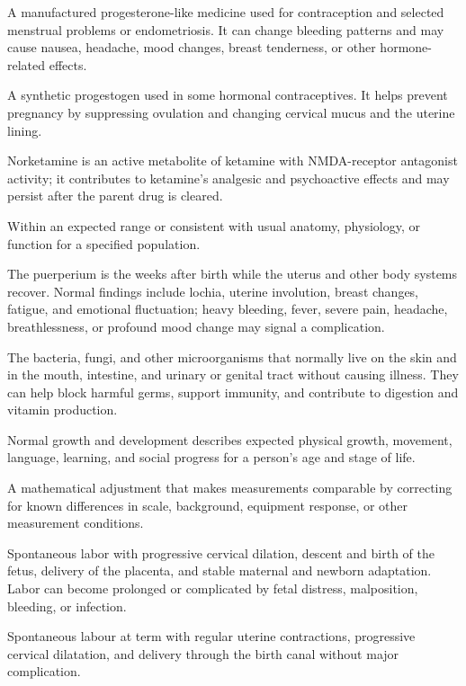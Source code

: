  A manufactured progesterone-like medicine used for contraception and selected menstrual problems or endometriosis. It can change bleeding patterns and may cause nausea, headache, mood changes, breast tenderness, or other hormone-related effects.

 A synthetic progestogen used in some hormonal contraceptives. It helps prevent pregnancy by suppressing ovulation and changing cervical mucus and the uterine lining.

 Norketamine is an active metabolite of ketamine with NMDA-receptor antagonist activity; it contributes to ketamine's analgesic and psychoactive effects and may persist after the parent drug is cleared.

 Within an expected range or consistent with usual anatomy, physiology, or function for a specified population.

 The puerperium is the weeks after birth while the uterus and other body systems recover. Normal findings include lochia, uterine involution, breast changes, fatigue, and emotional fluctuation; heavy bleeding, fever, severe pain, headache, breathlessness, or profound mood change may signal a complication.

 The bacteria, fungi, and other microorganisms that normally live on the skin and in the mouth, intestine, and urinary or genital tract without causing illness. They can help block harmful germs, support immunity, and contribute to digestion and vitamin production.

 Normal growth and development describes expected physical growth, movement, language, learning, and social progress for a person’s age and stage of life.

 A mathematical adjustment that makes measurements comparable by correcting for known differences in scale, background, equipment response, or other measurement conditions.

 Spontaneous labor with progressive cervical dilation, descent and birth of the fetus, delivery of the placenta, and stable maternal and newborn adaptation. Labor can become prolonged or complicated by fetal distress, malposition, bleeding, or infection.

 Spontaneous labour at term with regular uterine contractions, progressive cervical dilatation, and delivery through the birth canal without major complication.

